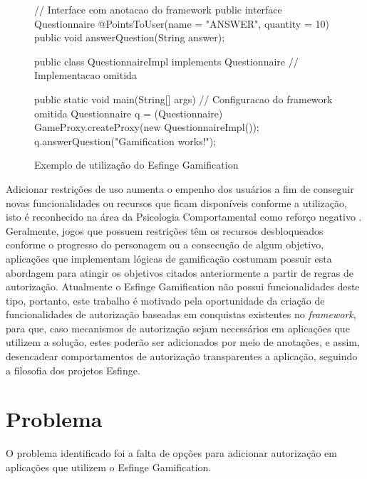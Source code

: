 \begin{figure}[H]
    \centering
    \caption{Exemplo de utilização do Esfinge Gamification}
    \begin{java}

// Interface com anotacao do framework
public interface Questionnaire {
    @PointsToUser(name = "ANSWER", quantity = 10)
    public void answerQuestion(String answer);
}

public class QuestionnaireImpl implements Questionnaire {
    // Implementacao omitida
}

public static void main(String[] args) {
    // Configuracao do framework omitida
    Questionnaire q = (Questionnaire) GameProxy.createProxy(new QuestionnaireImpl());
    q.answerQuestion("Gamification works!");
}
\end{java}
    \label{fig:esfingesample}
\end{figure}

\par Adicionar restrições de uso aumenta o empenho dos usuários a fim de conseguir novas funcionalidades ou recursos que ficam disponíveis conforme a utilização, isto é reconhecido na área da Psicologia Comportamental como reforço negativo  \cite{skinner1990behavior}. Geralmente, jogos que possuem restrições têm os recursos desbloqueados conforme o progresso do personagem ou a consecução de algum objetivo, aplicações que implementam lógicas de gamificação costumam possuir esta abordagem para atingir os objetivos citados anteriormente a partir de regras de autorização. Atualmente o Esfinge Gamification não possui funcionalidades deste tipo, portanto, este trabalho é motivado pela oportunidade da criação de funcionalidades de autorização baseadas em conquistas existentes no \textit{framework}, para que, caso mecanismos de autorização sejam necessários em aplicações que utilizem a solução, estes poderão ser adicionados por meio de anotações, e assim, desencadear comportamentos de autorização transparentes a aplicação, seguindo a filosofia dos projetos Esfinge.

\section{Problema}

\par O problema identificado foi a falta de opções para adicionar autorização em aplicações que utilizem o Esfinge Gamification.

